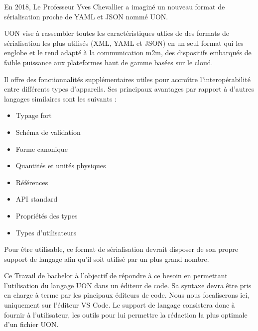 
En 2018, Le Professeur Yves Chevallier a imaginé un nouveau format de sérialisation proche de YAML et JSON nommé UON.

UON vise à rassembler toutes les caractéristiques utlies de des formats de sérialisation les plus utilisés (XML, YAML et JSON) en un seul format qui les englobe et le rend adapté à la communication m2m, des dispositifs embarqués de faible puissance aux plateformes haut de gamme basées sur le cloud.

Il offre des fonctionnalités supplémentaires utiles pour accroître l'interopérabilité entre différents types d'appareils. Ses principaux avantages par rapport à d'autres langages similaires sont les suivants :



\begin{itemize}
    \item Typage fort
    \item Schéma de validation
    \item Forme canonique
    \item Quantités et unités physiques
    \item Références
    \item API standard
    \item Propriétés des types
    \item Types d'utilisateurs
\end{itemize}

Pour être utilisable, ce format de sérialisation devrait disposer de son propre support de langage afin qu'il soit utilisé par un plus grand nombre.

Ce Travail de bachelor à l'objectif de répondre à ce besoin en permettant l'utilisation du langage UON dans un éditeur de code.
Sa syntaxe devra être pris en charge à terme par les pincipaux éditeurs de code. Nous nous focaliserons ici, uniquement sur l'éditeur VS Code.
Le support de langage consistera donc à fournir à l'utilisateur, les outils pour lui permettre la rédaction la plus optimale d'un fichier UON.

